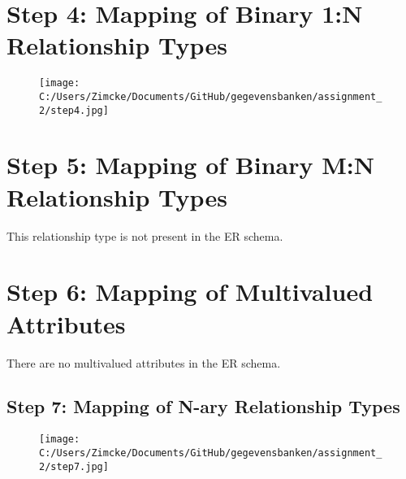 \documentclass[a4paper,twoside,10pt]{report}
\begin{document}
\begin{landscape}

\section{Step 4: Mapping of Binary 1:N Relationship Types}\label{hints}

\begin{figure}[hp]
		\texttt{[image: C:/Users/Zimcke/Documents/GitHub/gegevensbanken/assignment\_2/step4.jpg]}
	\label{fig:step4}
\end{figure}

\section{Step 5: Mapping of Binary M:N Relationship Types}\label{hints}

This relationship type is not present in the ER schema.

\section{Step 6: Mapping of Multivalued Attributes}\label{hints}

There are no multivalued attributes in the ER schema.

\end{landscape}
\restoregeometry

\begin{landscape}

\section{Step 7: Mapping of N-ary Relationship Types}\label{hints}

\begin{figure}[hp]
		\texttt{[image: C:/Users/Zimcke/Documents/GitHub/gegevensbanken/assignment\_2/step7.jpg]}
	\label{fig:step7}
\end{figure}


\end{landscape}
\restoregeometry






\end{document}
